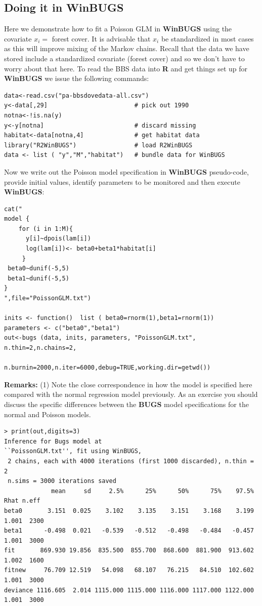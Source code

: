 \subsection{Doing it in WinBUGS}

Here we demonstrate how to fit a Poisson GLM in {\bf WinBUGS} using the
covariate $x_{i} =$ forest cover. It is advisable that $x_i$ be
standardized in most cases as this will improve mixing of the Markov
chains. Recall that the data we have stored include a standardized
covariate (forest cover) and so we don't have to worry about that
here.  To read the BBS data into {\bf R} and get things set up for
{\bf WinBUGS}
we issue the following commands:
{\small
\begin{verbatim}
data<-read.csv("pa-bbsdovedata-all.csv")
y<-data[,29]                        # pick out 1990
notna<-!is.na(y)
y<-y[notna]                         # discard missing
habitat<-data[notna,4]              # get habitat data
library("R2WinBUGS")                # load R2WinBUGS
data <- list ( "y","M","habitat")   # bundle data for WinBUGS
\end{verbatim}
}
Now we write out the Poisson model specification in {\bf WinBUGS}
pseudo-code, provide initial values, identify parameters to be
monitored and then execute {\bf WinBUGS}:
{\small
\begin{verbatim}
cat("
model {
    for (i in 1:M){
      y[i]~dpois(lam[i])
      log(lam[i])<- beta0+beta1*habitat[i]
     }
 beta0~dunif(-5,5)
 beta1~dunif(-5,5)
}
",file="PoissonGLM.txt")

inits <- function()  list ( beta0=rnorm(1),beta1=rnorm(1))
parameters <- c("beta0","beta1")
out<-bugs (data, inits, parameters, "PoissonGLM.txt", n.thin=2,n.chains=2,
                n.burnin=2000,n.iter=6000,debug=TRUE,working.dir=getwd())
\end{verbatim}
}
{\bf Remarks:} (1) Note the close correspondence in how the model is
specified here compared with the normal regression model
previously. As an exercise you should discuss the specific differences
between the {\bf BUGS} model specifications for the normal and Poisson
models.
{\small
\begin{verbatim}
> print(out,digits=3)
Inference for Bugs model at
``PoissonGLM.txt'', fit using WinBUGS,
 2 chains, each with 4000 iterations (first 1000 discarded), n.thin = 2
 n.sims = 3000 iterations saved
             mean     sd     2.5%      25%      50%      75%    97.5%  Rhat n.eff
beta0       3.151  0.025    3.102    3.135    3.151    3.168    3.199 1.001  2300
beta1      -0.498  0.021   -0.539   -0.512   -0.498   -0.484   -0.457 1.001  3000
fit       869.930 19.856  835.500  855.700  868.600  881.900  913.602 1.002  1600
fitnew     76.709 12.519   54.098   68.107   76.215   84.510  102.602 1.001  3000
deviance 1116.605  2.014 1115.000 1115.000 1116.000 1117.000 1122.000 1.001  3000
\end{verbatim}
}

